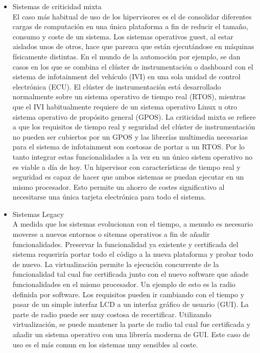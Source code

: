 \begin{itemize}
	\item Sistemas de criticidad mixta\\
	El caso más habitual de uso de los hipervisores es el de consolidar diferentes cargas de computación en una única
	plataforma a fin de reducir el tamaño, consumo y coste de un sistema. Los sistemas operativos guest, al estar aislados unos de otros, hace que parezca que están ejecutándose en máquinas físicamente distintas. En el mundo de la automoción por ejemplo,
	se dan casos en los que se combina el clúster de instrumentación o dashboard con el sistema de infotainment del vehículo (\acrshort{IVI}) en una sola unidad de control electrónica (ECU). El clúster de instrumentación está desarrollado normalmente sobre un sistema operativo de tiempo real (\acrshort{RTOS}), mientras que el \acrshort{IVI} habitualmente requiere de un sistema operativo Linux u otro sistema operativo de propósito general (GPOS). La criticidad mixta se refiere a que los requisitos de tiempo real y seguridad del clúster de instrumentación no pueden ser cubiertos por un GPOS y las librerías multimedia necesarias para el sistema de infotainment son costosas de portar a un \acrshort{RTOS}. Por lo tanto integrar estas funcionalidades a la vez en un único sistem operativo no es viable a día de hoy. Un hipervisor con características de tiempo real y seguridad es capaz de hacer que ambos sistemas se puedan ejecutar en un mismo procesador. Esto permite un ahorro de costes significativo al necesitarse una única tarjeta electrónica para todo el sistema.
	\item Sistemas Legacy\\
	A medida que los sistemas evolucionan con el tiempo, a menudo es necesario moverse a nuevos entornos o sitemas operativos a fin de añadir funcionalidades. Preservar la funcionalidad ya existente y certificada del sistema requeriría portar todo el código a la nueva plataforma y probar todo de nuevo. La virtualización permite la ejecución concurrente de la funcionalidad tal cual fue certificada junto con el nuevo software que añade funcionalidades en el mismo procesador. Un ejemplo de esto es la radio definida por software. Los requisitos pueden ir cambiando con el tiempo y pasar de un simple interfaz \acrshort{LCD} a un interfaz gráfico de usuario (\acrshort{GUI}). La parte de radio puede ser muy costosa de recertificar. Utilizando virtualización, se puede mantener la parte de radio tal cual fue certificada y añadir un sistema operativo con una librería moderna de GUI.
	Este caso de uso es el más comun en los sistemas muy sensibles al coste.\\[1cm]
\end{itemize}
